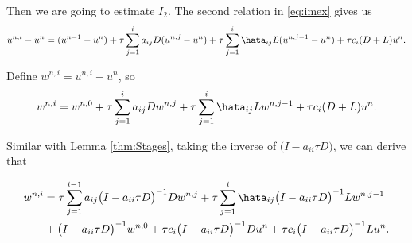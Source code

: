 

Then we are going to estimate $I_2$. The second relation in \ref{eq:imex} gives us
$$u^{n,i}-u^n = (u^{n-1}-u^n) + \tau \sum\limits_{j=1}^ia_{ij}D(u^{n,j}-u^n) + \tau \sum\limits_{j=1}^i\hata_{ij}L(u^{n,j-1}-u^n) + \tau c_i(D+L)u^n.$$

Define $w^{n,i} = u^{n,i}-u^n$, so
$$w^{n,i} = w^{n,0} + \tau \sum\limits_{j=1}^ia_{ij}Dw^{n,j} + \tau \sum\limits_{j=1}^i\hata_{ij}Lw^{n,j-1} + \tau c_i(D+L)u^n.$$

Similar with Lemma \ref{thm:Stages}, taking the inverse of $\big(I-a_{ii}\tau D\big)$, we can derive that

\begin{align*}w^{n,i} &= \tau \sum\limits_{j=1}^{i-1}a_{ij}\big(I-a_{ii}\tau D\big)^{-1}Dw^{n,j} 
+ \tau \sum\limits_{j=1}^i\hata_{ij}\big(I-a_{ii}\tau D\big)^{-1}Lw^{n,j-1} \\
&+ \big(I-a_{ii}\tau D\big)^{-1}w^{n,0} 
+ \tau c_i\big(I-a_{ii}\tau D\big)^{-1}Du^n+ \tau c_i\big(I-a_{ii}\tau D\big)^{-1}Lu^n. 
\end{align*}



